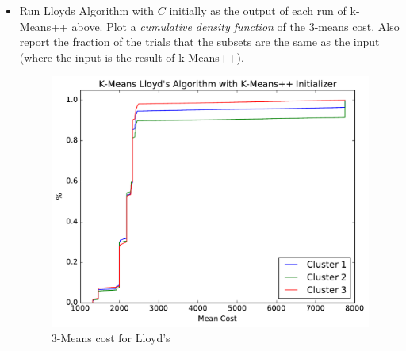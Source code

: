 \documentclass[11pt]{article}
\newcommand{\D}{\textsf{D}}
\begin{document}
\begin{itemize}
\item  Run Lloyds Algorithm with $C$ initially as the output of each run of \textsf{k-Means++} above.  Plot a \emph{cumulative density function} of the $3$-means cost.  Also report the fraction of the trials that the subsets are the same as the input (where the input is the result of \textsf{k-Means++}).  


\begin{figure}[H]
\centering
\includegraphics[width=.75\textwidth]{kmeanspp_lloyds.pdf}
\caption{$3$-Means cost for Lloyd's}
\end{figure}
\end{itemize}

%
%
%
%
\end{document}
